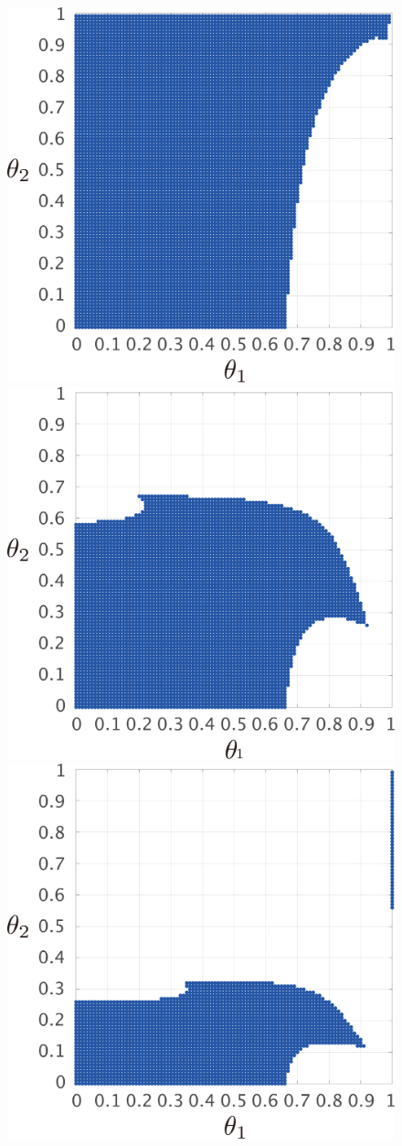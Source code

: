 \documentclass[tombow,dvipdfmx]{corona-a5-1.1}
\begin{document}
\begin{figure}[t!]
  \centering
  {
  \begin{minipage}{0.49\linewidth}
    \centering
    \includegraphics[width = 0.8\linewidth]{figs/gam01}
    \medskip
  \end{minipage}
  \begin{minipage}{0.49\linewidth}
    \centering
    \includegraphics[width = 0.8\linewidth]{figs/gam2}
    \medskip
  \end{minipage}
    \centering
    \includegraphics[width = .4\linewidth]{figs/gam5}
}
\end{figure}
\end{document}
